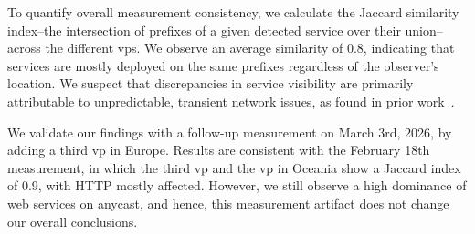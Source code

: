 To quantify overall measurement consistency, we calculate the Jaccard similarity index--the intersection of prefixes of a given detected service over their union--across the different \glspl{vp}.
We observe an average similarity of 0.8, indicating that services are mostly deployed on the same prefixes regardless of the observer's location.
We suspect that discrepancies in service visibility are primarily attributable to unpredictable, transient network issues, as found in prior work~\cite{wan-origin-scanning}.

We validate our findings with a follow-up measurement on March 3rd, 2026, by adding a third \gls{vp} in Europe.
Results are consistent with the February 18th measurement, in which the third \gls{vp} and the \gls{vp} in Oceania show a Jaccard index of 0.9, with HTTP mostly affected.
However, we still observe a high dominance of web services on anycast, and hence, this measurement artifact does not change our overall conclusions.
